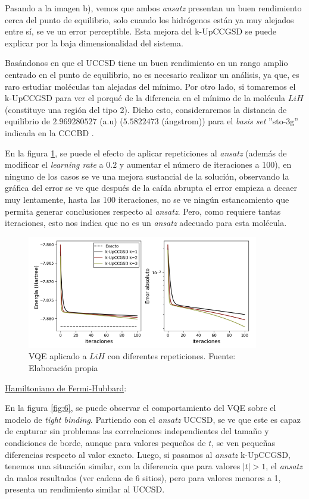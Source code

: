 Pasando a la imagen b), vemos que ambos \textit{ansatz} presentan un buen rendimiento cerca del punto de equilibrio, solo cuando los hidrógenos están ya muy alejados entre sí, se ve un error perceptible. Esta mejora del k-UpCCGSD se puede explicar por la baja dimensionalidad del sistema.

Basándonos en que el UCCSD tiene un buen rendimiento en un rango amplio centrado en el punto de equilibrio, no es necesario realizar un análisis, ya que, es raro estudiar moléculas tan alejadas del mínimo. Por otro lado, si tomaremos el k-UpCCGSD para ver el porqué de la diferencia en el mínimo de la molécula $LiH$ (constituye una región del tipo 2). Dicho esto, consideraremos la distancia de equilibrio de $2.969280527$ (a.u) ($5.5822473$ (ángstrom)) para el \textit{basis set} ''sto-3g'' indicada en la CCCBD \cite{CCCBDB}. 


En la figura \ref{fig:10}, se puede el efecto de aplicar repeticiones al \textit{ansatz} (además de modificar el \textit{learning rate} a $0.2$ y aumentar el número de iteraciones a 100), en ninguno de los casos se ve una mejora sustancial de la solución, observando la gráfica del error se ve que después de la caída abrupta el error empieza a decaer muy lentamente, hasta las 100 iteraciones, no se ve ningún estancamiento que permita generar conclusiones respecto al \textit{ansatz}. Pero, como requiere tantas iteraciones, esto nos indica que no es un \textit{ansatz} adecuado para esta molécula. 

\begin{figure}[H]
\centering
\includegraphics[width=0.9\textwidth]{figures/S4/moleculas/barridomoleculas2.png}
\caption{\label{fig:10} VQE aplicado a $LiH$ con diferentes repeticiones. Fuente: Elaboración propia}
\end{figure}


\underline{Hamiltoniano de Fermi-Hubbard}:

En la figura \ref{fig:6}, se puede observar el comportamiento del VQE sobre el modelo de \textit{tight binding}. Partiendo con el \textit{ansatz} UCCSD, se ve que este es capaz de capturar sin problemas las correlaciones independientes del tamaño y condiciones de borde, aunque para valores pequeños de $t$, se ven pequeñas diferencias respecto al valor exacto. Luego, si pasamos al \textit{ansatz} k-UpCCGSD, tenemos una situación similar, con la diferencia que para valores $|t|>1$, el \textit{ansatz} da malos resultados (ver cadena de 6 sitios), pero para valores menores a 1, presenta un rendimiento similar al UCCSD.

